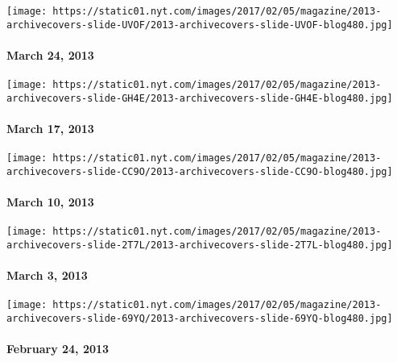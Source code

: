 \href{http://www.nytimes.com/indexes/2013/03/24/magazine/index.html}{}

\texttt{[image: https://static01.nyt.com/images/2017/02/05/magazine/2013-archivecovers-slide-UVOF/2013-archivecovers-slide-UVOF-blog480.jpg]}

\hypertarget{march-24-2013}{%
\paragraph{March 24, 2013}\label{march-24-2013}}

\href{http://www.nytimes.com/indexes/2013/03/17/magazine/index.html}{}

\texttt{[image: https://static01.nyt.com/images/2017/02/05/magazine/2013-archivecovers-slide-GH4E/2013-archivecovers-slide-GH4E-blog480.jpg]}

\hypertarget{march-17-2013}{%
\paragraph{March 17, 2013}\label{march-17-2013}}

\href{http://www.nytimes.com/indexes/2013/03/10/magazine/index.html}{}

\texttt{[image: https://static01.nyt.com/images/2017/02/05/magazine/2013-archivecovers-slide-CC9O/2013-archivecovers-slide-CC9O-blog480.jpg]}

\hypertarget{march-10-2013}{%
\paragraph{March 10, 2013}\label{march-10-2013}}

\href{http://www.nytimes.com/indexes/2013/03/03/magazine/index.html}{}

\texttt{[image: https://static01.nyt.com/images/2017/02/05/magazine/2013-archivecovers-slide-2T7L/2013-archivecovers-slide-2T7L-blog480.jpg]}

\hypertarget{march-3-2013}{%
\paragraph{March 3, 2013}\label{march-3-2013}}

\href{http://www.nytimes.com/indexes/2013/02/24/magazine/index.html}{}

\texttt{[image: https://static01.nyt.com/images/2017/02/05/magazine/2013-archivecovers-slide-69YQ/2013-archivecovers-slide-69YQ-blog480.jpg]}

\hypertarget{february-24-2013}{%
\paragraph{February 24, 2013}\label{february-24-2013}}

